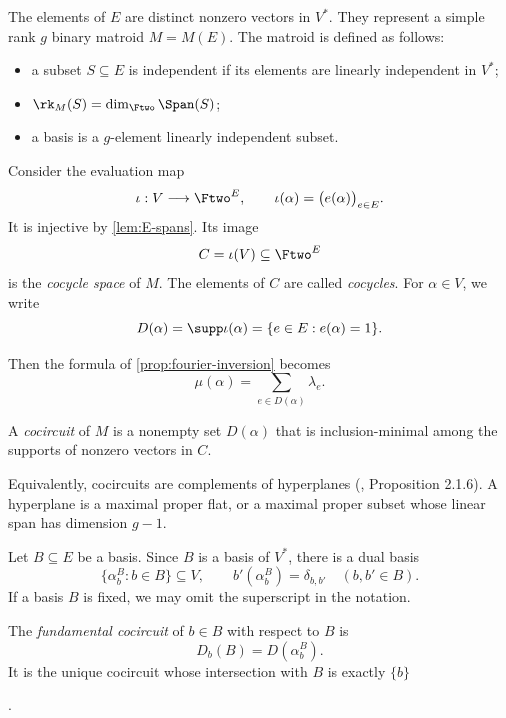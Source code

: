 \documentclass[11pt,letterpaper]{amsart}
\begin{document}
The elements of $E$ are distinct nonzero vectors in $V^*$.  They represent a simple rank $g$ binary matroid $M=M(E)$. The matroid is defined as follows:
\begin{itemize}
\item a subset $S\subseteq E$ is independent if its elements are linearly independent in $V^*$;
\item $\rk_M(S)=\dim_{\Ftwo}\Span(S)$;
\item a basis is a $g$-element linearly independent subset.
\end{itemize}

Consider the evaluation map
\begin{equation*}
  \iota:V\longrightarrow\Ftwo^E,
  \qquad
  \iota(\alpha)=\bigl(e(\alpha)\bigr)_{e\in E}.
\end{equation*}
It is injective by \cref{lem:E-spans}.  Its image
\[
  C=\iota(V)\subseteq\Ftwo^E
\]
is the \emph{cocycle space} of $M$. The elements of $C$ are called \emph{cocycles}. For $\alpha\in V$, we write
\begin{equation*}
  D(\alpha)=\supp\iota(\alpha)
  =\{e\in E:e(\alpha)=1\}.
\end{equation*}

Then the formula of \cref{prop:fourier-inversion} becomes
\begin{equation}\label{eq:mu-D}
  \mu(\alpha)=\sum_{e\in D(\alpha)}\lambda_e.
\end{equation}

\begin{definition}
A \emph{cocircuit} of $M$ is a nonempty set $D(\alpha)$ that is inclusion-minimal among the supports of nonzero vectors in $C$.
\end{definition}

Equivalently, cocircuits are complements of hyperplanes (\cite{oxley}, Proposition 2.1.6).  A hyperplane is a maximal proper flat, or a maximal proper subset whose linear span has dimension $g-1$.

Let $B\subseteq E$ be a basis.  Since $B$ is a basis of $V^*$, there is a dual basis
\[
  \{\alpha_b^B:b\in B\}\subseteq V,
  \qquad
  b'(\alpha_b^B)=\delta_{b,b'}\quad(b,b'\in B).
\]
If a basis $B$ is fixed, we may omit the superscript in the notation.

\begin{definition}
The \emph{fundamental cocircuit} of $b\in B$ with respect to $B$ is
\[
  D_b(B)=D(\alpha_b^B).
\]
It is the unique cocircuit whose intersection with $B$ is exactly $\{b\}$ \cite[2.1 Exercise 10]{oxley}
\end{definition}.
\end{document}
